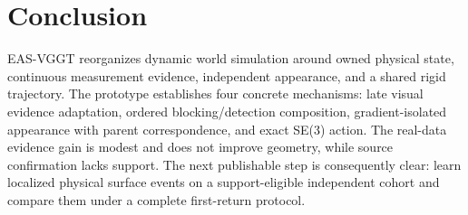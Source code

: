 \section{Conclusion}
EAS-VGGT reorganizes dynamic world simulation around owned physical state, continuous
measurement evidence, independent appearance, and a shared rigid trajectory. The
prototype establishes four concrete mechanisms: late visual evidence adaptation,
ordered blocking/detection composition, gradient-isolated appearance with parent
correspondence, and exact SE(3) action. The real-data evidence gain is modest and does
not improve geometry, while source confirmation lacks support. The next publishable
step is consequently clear: learn localized physical surface events on a support-eligible
independent cohort and compare them under a complete first-return protocol.
